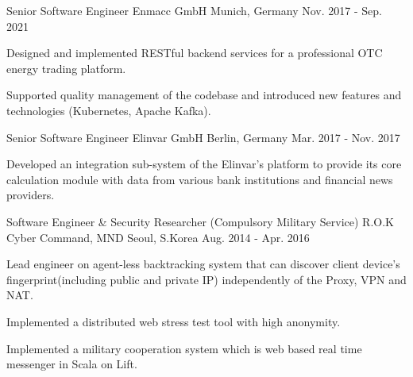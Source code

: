 \begin{cventries}
    \cventry
    {Senior Software Engineer} %
    {Enmacc GmbH} %
    {Munich, Germany} %
    {Nov. 2017 - Sep. 2021} %
    {
        \begin{cvitems} %
            \item {Designed and implemented RESTful backend services for a professional OTC energy trading platform.}
            \item {Supported quality management of the codebase and introduced new features and technologies (Kubernetes, Apache Kafka).}
        \end{cvitems}
    }

    \cventry
    {Senior Software Engineer} %
    {Elinvar GmbH} %
    {Berlin, Germany} %
    {Mar. 2017 - Nov. 2017} %
    {
        \begin{cvitems} %
            \item {Developed an integration sub-system of the Elinvar's platform to provide its core calculation module with data from various bank institutions and financial news providers.}
        \end{cvitems}
    }

    \cventry
    {Software Engineer \& Security Researcher (Compulsory Military Service)} %
    {R.O.K Cyber Command, MND} %
    {Seoul, S.Korea} %
    {Aug. 2014 - Apr. 2016} %
    {
        \begin{cvitems} %
            \item {Lead engineer on agent-less backtracking system that can discover client device's fingerprint(including public and private IP) independently of the Proxy, VPN and NAT.}
            \item {Implemented a distributed web stress test tool with high anonymity.}
            \item {Implemented a military cooperation system which is web based real time messenger in Scala on Lift.}
        \end{cvitems}
    }


\end{cventries}
